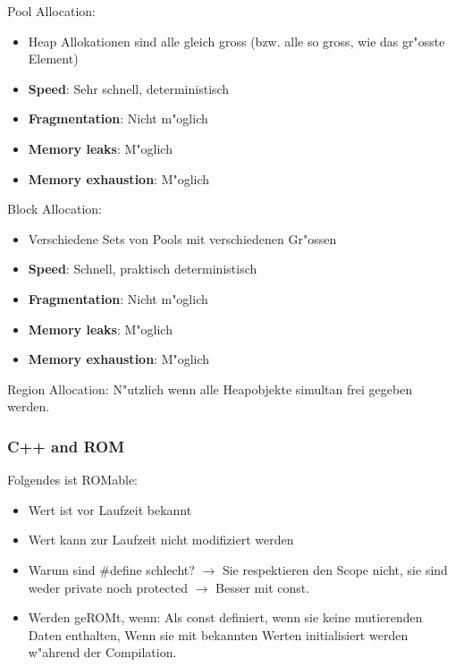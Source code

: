 Pool Allocation: 
\begin{itemize}
\item Heap Allokationen sind alle gleich gross (bzw. alle so gross, wie das gr"osste Element) 
\item \textbf{Speed}: Sehr schnell, deterministisch 
\item \textbf{Fragmentation}: Nicht m"oglich
\item \textbf{Memory leaks}: M"oglich
\item \textbf{Memory exhaustion}: M"oglich
\end{itemize}

Block Allocation: 
\begin{itemize}
\item Verschiedene Sets von Pools mit verschiedenen Gr"ossen 
\item \textbf{Speed}: Schnell, praktisch deterministisch 
\item \textbf{Fragmentation}: Nicht m"oglich
\item \textbf{Memory leaks}: M"oglich
\item \textbf{Memory exhaustion}: M"oglich
\end{itemize}

Region Allocation: N"utzlich wenn alle Heapobjekte simultan frei gegeben werden. 

\subsubsection{C++ and ROM}
Folgendes ist ROMable: 
\begin{itemize}
\item Wert ist vor Laufzeit bekannt
\item Wert kann zur Laufzeit nicht modifiziert werden
\item Warum sind \#define schlecht? $\rightarrow$ Sie respektieren den Scope nicht, sie sind weder private noch protected $\rightarrow$ Besser mit const. 
\item Werden geROMt, wenn: Als const definiert, wenn sie keine mutierenden Daten enthalten, Wenn sie mit bekannten Werten initialisiert werden w"ahrend der Compilation. 
\end{itemize}